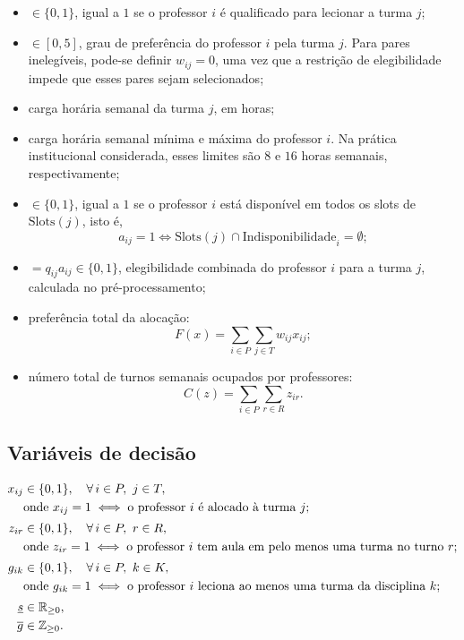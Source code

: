 \documentclass[11pt,a4paper]{article}
\begin{document}
\begin{itemize}[leftmargin=2.2cm]
  \item[$q_{ij}$] $\in \{0,1\}$, igual a $1$ se o professor $i$
  é qualificado para lecionar a turma $j$;

  \item[$w_{ij}$] $\in [0,5]$, grau de preferência do professor $i$
  pela turma $j$. Para pares inelegíveis, pode-se definir
  $w_{ij}=0$, uma vez que a restrição de elegibilidade impede
  que esses pares sejam selecionados;

  \item[$h_j$] carga horária semanal da turma $j$, em horas;

  \item[$h_i^{\min},h_i^{\max}$] carga horária semanal mínima e
  máxima do professor $i$. Na prática institucional considerada,
  esses limites são $8$ e $16$ horas semanais, respectivamente;

  \item[$a_{ij}$] $\in \{0,1\}$, igual a $1$ se o professor $i$
  está disponível em todos os slots de $\mathrm{Slots}(j)$, isto é,
  \[
  a_{ij}=1
  \iff
  \mathrm{Slots}(j)\cap
  \mathrm{Indisponibilidade}_i=\emptyset;
  \]

  \item[$e_{ij}$] $=q_{ij}a_{ij}\in\{0,1\}$, elegibilidade
  combinada do professor $i$ para a turma $j$, calculada
  no pré-processamento;

  \item[$F(x)$] preferência total da alocação:
  \[
  F(x)=\sum_{i\in P}\sum_{j\in T}w_{ij}x_{ij};
  \]

  \item[$C(z)$] número total de turnos semanais ocupados por
  professores:
  \[
  C(z)=\sum_{i\in P}\sum_{r\in R}z_{ir}.
  \]
\end{itemize}
\subsection{Variáveis de decisão}
\begin{align}
x_{ij} &\in \{0,1\}, \quad \forall\, i \in P,\ j \in T, \notag\\
&\text{onde } x_{ij}=1 \iff \text{o professor }i\text{ é alocado à turma }j; \notag\\[2pt]
z_{ir} &\in \{0,1\}, \quad \forall\, i \in P,\ r \in R, \notag\\
&\text{onde } z_{ir}=1 \iff \text{o professor }i\text{ tem aula em pelo menos uma turma no turno }r; \notag\\[2pt]
g_{ik} &\in \{0,1\}, \quad \forall\, i \in P,\ k \in K, \notag\\
&\text{onde } g_{ik}=1 \iff \text{o professor }i\text{ leciona ao menos uma turma da disciplina }k; \notag\\[2pt]
\underline{s} &\in \mathbb{R}_{\geq 0}, \notag\\
\overline{g} &\in \mathbb{Z}_{\geq 0}. \notag
\end{align}
\end{document}
